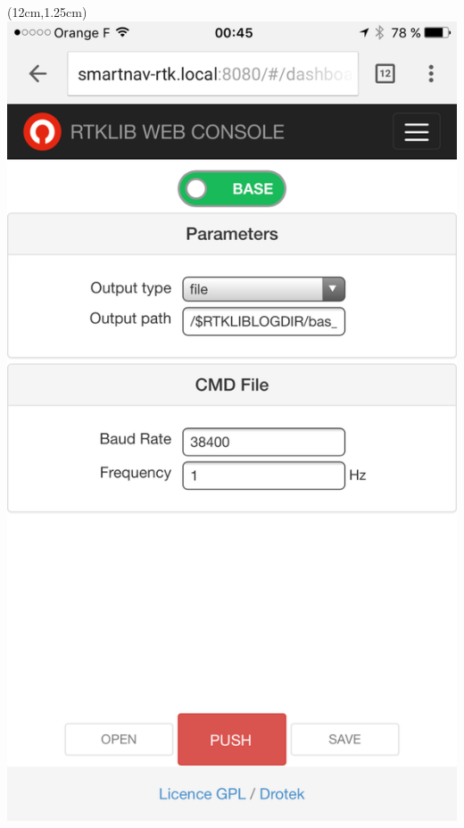 \documentclass[xetex,с,aspectratio=169]{beamer}
\begin{document}
\begin{frame}
\begin{textblock*}{3.25cm}
  \end{textblock*}
  \begin{textblock*}{1.5cm}(12cm,1.25cm)
    \includegraphics[width=\textwidth]{../img/drotek-web}
  \end{textblock*}
\end{frame}
\end{document}

